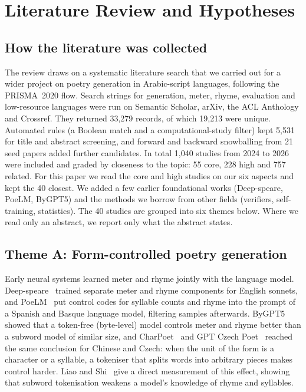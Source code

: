\section{Literature Review and Hypotheses}
\label{sec:lit}

\subsection{How the literature was collected}
The review draws on a systematic literature search that we carried out for a wider project on poetry generation in
Arabic-script languages, following the PRISMA~2020 flow. Search strings for generation, meter, rhyme, evaluation and
low-resource languages were run on Semantic Scholar, arXiv, the ACL Anthology and Crossref. They returned 33,279
records, of which 19,213 were unique. Automated rules (a Boolean match and a computational-study filter) kept 5,531 for
title and abstract screening, and forward and backward snowballing from 21 seed papers added further candidates. In
total 1,040 studies from 2024 to 2026 were included and graded by closeness to the topic: 55 core, 228 high and 757
related. For this paper we read the core and high studies on our six aspects and kept the 40 closest. We added a few
earlier foundational works (Deep-speare, PoeLM, ByGPT5) and the methods we borrow from other fields (verifiers,
self-training, statistics). The 40 studies are grouped into six themes below. Where we read only an abstract, we
report only what the abstract states.

\subsection{Theme A: Form-controlled poetry generation}
Early neural systems learned meter and rhyme jointly with the language model. Deep-speare~\cite{lau2018deepspeare}
trained separate meter and rhyme components for English sonnets, and PoeLM~\cite{ormazabal2022poelm} put control codes
for syllable counts and rhyme into the prompt of a Spanish and Basque language model, filtering samples afterwards.
ByGPT5~\cite{belouadi2023bygpt5} showed that a token-free (byte-level) model controls meter and rhyme better than a
subword model of similar size, and CharPoet~\cite{yu2024charpoet} and GPT Czech Poet~\cite{chudoba2024gptczechpoet}
reached the same conclusion for Chinese and Czech: when the unit of the form is a character or a syllable, a tokeniser
that splits words into arbitrary pieces makes control harder. Liao and Shi~\cite{liao2026tokenization} give a
direct measurement of this effect, showing that subword tokenisation weakens a model's knowledge of rhyme and
syllables.

